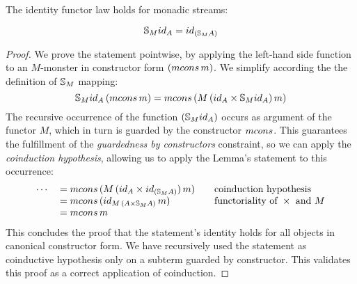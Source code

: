 \begin{lemma}\label{lemma:functor_id}
The identity functor law holds for monadic streams:

$$
\stream{M} \id_A = \id_{(\stream{M} A)}
$$

\end{lemma}
\begin{proof}
We prove the statement pointwise, by applying the left-hand side function to an $M$-monster in constructor form $(\mcons\,m)$.
We simplify according the the definition of $\mathbb{S}_{M}$ mapping:
$$
\stream{M} \id_A\,(\mcons\,m)
= \mcons\,(M\,(\id_A\times \stream{M} \id_A)\,m)
$$
The recursive occurrence of the function $(\stream{M} \id_A)$ occurs as argument of the functor $M$, which in turn is guarded by the constructor $\mcons$.
This guarantees the fulfillment of the {\em guardedness by constructors} constraint, so we can apply the {\em coinduction hypothesis}, allowing us to apply the Lemma's statement to this occurrence:
$$
\begin{array}{rl@{\qquad}l}
\cdots
& {}= \mcons\,(M\,(\id_A\times \id_{(\stream{M} A)})\,m)
  & \mbox{coinduction hypothesis}\\
& {}= \mcons\,(\id_{M\,(A\times \stream{M} A)}\,m)
  & \mbox{functoriality of }\times\mbox{ and }M\\
& {}= \mcons\,m
\end{array}
$$
This concludes the proof that the statement's identity holds for all objects in canonical constructor form.
We have recursively used the statement as coinductive hypothesis only on a subterm guarded by constructor.
This validates this proof as a correct application of coinduction.
\end{proof}

